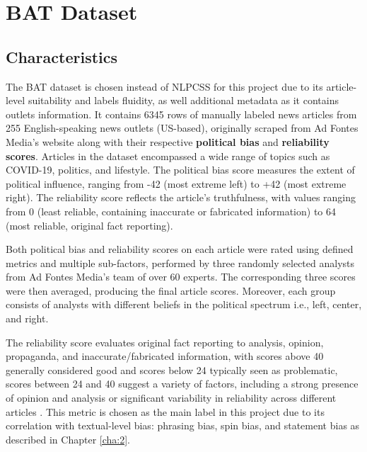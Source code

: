 \chapter{BAT Dataset}
\label{cha:3}

\section{Characteristics} \label{bat-characteristics}

The BAT dataset \cite{spinde-2023-bat} is chosen instead of NLPCSS \cite{chen-2020-nlpcss} for this project due to its article-level suitability and labels fluidity, as well additional metadata as it contains outlets information. It contains 6345 rows of manually labeled news articles from 255 English-speaking news outlets (US-based), originally scraped from Ad Fontes Media's website along with their respective \textbf{political bias} and \textbf{reliability scores}. Articles in the dataset encompassed a wide range of topics such as COVID-19, politics, and lifestyle. The political bias score measures the extent of political influence, ranging from -42 (most extreme left) to +42 (most extreme right). The reliability score reflects the article's truthfulness, with values ranging from 0 (least reliable, containing inaccurate or fabricated information) to 64 (most reliable, original fact reporting).

Both political bias and reliability scores on each article were rated using defined metrics and multiple sub-factors, performed by three randomly selected analysts from Ad Fontes Media's team of over 60 experts. The corresponding three scores were then averaged, producing the final article scores. Moreover, each group consists of analysts with different beliefs in the political spectrum i.e., left, center, and right.

The reliability score evaluates original fact reporting to analysis, opinion, propaganda, and inaccurate/fabricated information, with scores above 40 generally considered good and scores below 24 typically seen as problematic, scores between 24 and 40 suggest a variety of factors, including a strong presence of opinion and analysis or significant variability in reliability across different articles \cite{adfontes}. This metric is chosen as the main label in this project due to its correlation with textual-level bias: phrasing bias, spin bias, and statement bias as described in Chapter \ref{cha:2}.


